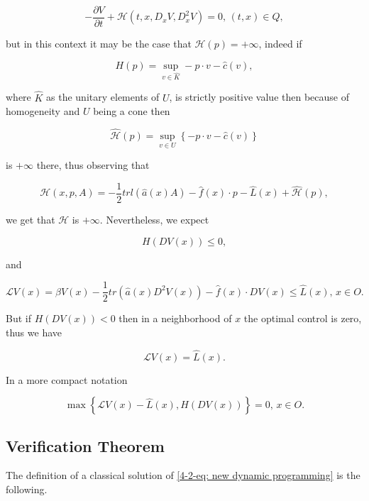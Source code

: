 \[-\frac{\partial V}{\partial t} + \mathcal{H}(t,x,D_x V,D_x^2 V)=0,\,(t,x)\in Q,\]

but in this context it may be the case that $\mathcal{H}(p)=+\infty$, indeed if 

\begin{equation}
    H(p) = \sup_{v\in\hat{K}}-p\cdot v-\hat{c}(v),
\end{equation}

where $\hat{K}$ as the unitary elements of $U$, is strictly positive value then because of homogeneity and $U$ being a cone then

\begin{equation}
    \hat{\mathcal{H}}(p)=\sup_{v\in U}\left\{-p\cdot v - \hat{c}(v)\right\}
\end{equation}

is $+\infty$ there, thus observing that

\[\mathcal{H}(x,p,A) = -\frac{1}{2}trl\left(\hat{a}(x)A\right) - \hat{f}(x)\cdot p - \hat{L}(x) + \hat{\mathcal{H}}(p),\]

we get that $\mathcal{H}$ is $+\infty$. Nevertheless, we expect

\begin{equation}
    H(DV(x)) \leq 0,
\end{equation}

and 

\begin{equation}
    \mathcal{L}V(x) = \beta V(x) - \frac{1}{2}tr\left(\hat{a}(x)D^2V(x)\right) - \hat{f}(x)\cdot DV(x)\leq \hat{L}(x), \, x\in O.
\end{equation}

But if $H(DV(x))<0$ then in a neighborhood of $x$ the optimal control is zero, thus we have

\[\mathcal{L}V(x)=\hat{L}(x).\]

In a more compact notation

\begin{equation}\label{4-2-eq: new dynamic programming}
    \max\left\{\mathcal{L}V(x)-\hat{L}(x),H(DV(x))\right\} = 0,\, x\in O.
\end{equation}

\subsection{Verification Theorem}

The definition of a classical solution of \eqref{4-2-eq: new dynamic programming} is the following.

